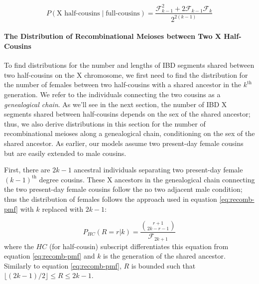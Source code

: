 \documentclass[11pt]{article}
\begin{document}
\begin{equation}
  P(\text{X half-cousins} \;|\; \text{full-cousins}) = \frac{\mathcal{F}_{k-1}^2 + 2 \mathcal{F}_{k-1} \mathcal{F}_k}{2^{2(k-1)}}
\end{equation}

\paragraph{The Distribution of Recombinational Meioses between Two X Half-Cousins}
\label{p:two-cousins-rms}

To find distributions for the number and lengths of IBD segments shared between
two half-cousins on the X chromosome, we first need to find the distribution
for the number of females between two half-cousins with a shared ancestor in
the $k^\text{th}$ generation. We refer to the individuals connecting the two
cousins as a \emph{genealogical chain}. As we'll see in the next section, the
number of IBD X segments shared between half-cousins depends on the sex of the
shared ancestor; thus, we also derive distributions in this section for the
number of recombinational meioses along a genealogical chain, conditioning on
the sex of the shared ancestor. As earlier, our models assume two present-day
female cousins but are easily extended to male cousins.

First, there are $2k-1$ ancestral individuals separating two present-day female
$(k-1)^\text{th}$ degree cousins. These X ancestors in the genealogical chain
connecting the two present-day female cousins follow the no two adjacent male
condition; thus the distribution of females follows the approach used in
equation \eqref{eq:recomb-pmf} with $k$ replaced with $2k-1$:

\begin{equation}
  \label{eq:recomb-sanc-pmf}
  P_{HC}(R=r | k) = \frac{ {r+1 \choose 2k-r-1} }{\mathcal{F}_{2k+1}}
\end{equation}
%
where the $HC$ (for half-cousin) subscript differentiates this equation from
equation \eqref{eq:recomb-pmf} and $k$ is the generation of the shared
ancestor. Similarly to equation \eqref{eq:recomb-pmf}, $R$ is bounded such that
$\lfloor (2k - 1)/2 \rfloor \le R \le 2k - 1$.
\end{document}
